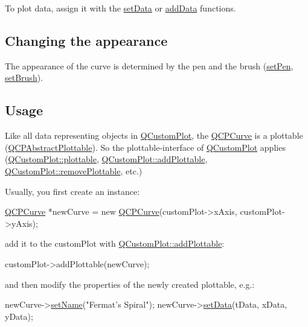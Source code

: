 To plot data, assign it with the \hyperlink{class_q_c_p_curve_a631ac886708460013b30052f49cbc9da}{set\-Data} or \hyperlink{class_q_c_p_curve_a4e24023c3b9ac75440c7a260172c99af}{add\-Data} functions.\hypertarget{class_q_c_p_statistical_box_appearance}{}\subsection{Changing the appearance}\label{class_q_c_p_statistical_box_appearance}
The appearance of the curve is determined by the pen and the brush (\hyperlink{class_q_c_p_abstract_plottable_ab74b09ae4c0e7e13142fe4b5bf46cac7}{set\-Pen}, \hyperlink{class_q_c_p_abstract_plottable_a7a4b92144dca6453a1f0f210e27edc74}{set\-Brush}). \hypertarget{class_q_c_p_statistical_box_usage}{}\subsection{Usage}\label{class_q_c_p_statistical_box_usage}
Like all data representing objects in \hyperlink{class_q_custom_plot}{Q\-Custom\-Plot}, the \hyperlink{class_q_c_p_curve}{Q\-C\-P\-Curve} is a plottable (\hyperlink{class_q_c_p_abstract_plottable}{Q\-C\-P\-Abstract\-Plottable}). So the plottable-\/interface of \hyperlink{class_q_custom_plot}{Q\-Custom\-Plot} applies (\hyperlink{class_q_custom_plot_a32de81ff53e263e785b83b52ecd99d6f}{Q\-Custom\-Plot\-::plottable}, \hyperlink{class_q_custom_plot_ab7ad9174f701f9c6f64e378df77927a6}{Q\-Custom\-Plot\-::add\-Plottable}, \hyperlink{class_q_custom_plot_af3dafd56884208474f311d6226513ab2}{Q\-Custom\-Plot\-::remove\-Plottable}, etc.)

Usually, you first create an instance\-: 
\begin{DoxyCode}
\hyperlink{class_q_c_p_curve}{QCPCurve} *newCurve = \textcolor{keyword}{new} \hyperlink{class_q_c_p_curve_a36de58e2652b3fa47bdf9187d421d3ce}{QCPCurve}(customPlot->xAxis, customPlot->yAxis);
\end{DoxyCode}
 add it to the custom\-Plot with \hyperlink{class_q_custom_plot_ab7ad9174f701f9c6f64e378df77927a6}{Q\-Custom\-Plot\-::add\-Plottable}\-: 
\begin{DoxyCode}
customPlot->addPlottable(newCurve);
\end{DoxyCode}
 and then modify the properties of the newly created plottable, e.\-g.\-: 
\begin{DoxyCode}
newCurve->\hyperlink{class_q_c_p_abstract_plottable_ab79c7ba76bc7fa89a4b3580e12149f1f}{setName}(\textcolor{stringliteral}{"Fermat's Spiral"});
newCurve->\hyperlink{class_q_c_p_curve_a631ac886708460013b30052f49cbc9da}{setData}(tData, xData, yData);
\end{DoxyCode}
 

